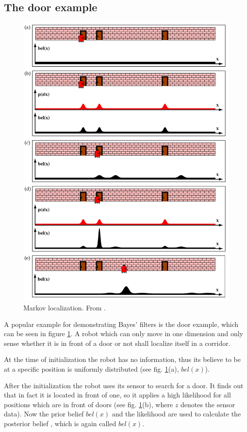 \documentclass[Thesis.tex]{subfiles}
\begin{document}
\subsection{The door example}
\begin{figure}
  \centering
  \includegraphics[width=.9\columnwidth]{pics/markov_localization}
  \caption{Markov localization. From \cite[p.~6]{ThrunBurgardFox:2005}.}
  \label{fig:markov_localization_one_dimension}
\end{figure}

A popular example for demonstrating Bayes' filters is the door example, which can be seen in figure \ref{fig:markov_localization_one_dimension}. A robot which can only move in one dimension and only sense whether it is in front of a door or not shall localize itself in a corridor. 

At the time of initialization the robot has no information, thus its believe to be at a specific position is uniformly distributed (see fig. \ref{fig:markov_localization_one_dimension}(a), $bel(x)$).

After the initialization the robot uses its sensor to search for a door. It finds out that in fact it is located in front of one, so it applies a high likelihood for all positions which are in front of doors (see fig. \ref{fig:markov_localization_one_dimension}(b),  where $z$ denotes the sensor data). Now the prior belief $bel(x)$ and the likelihood  are used to calculate the posterior belief , which is again called $bel(x)$.
\end{document}
